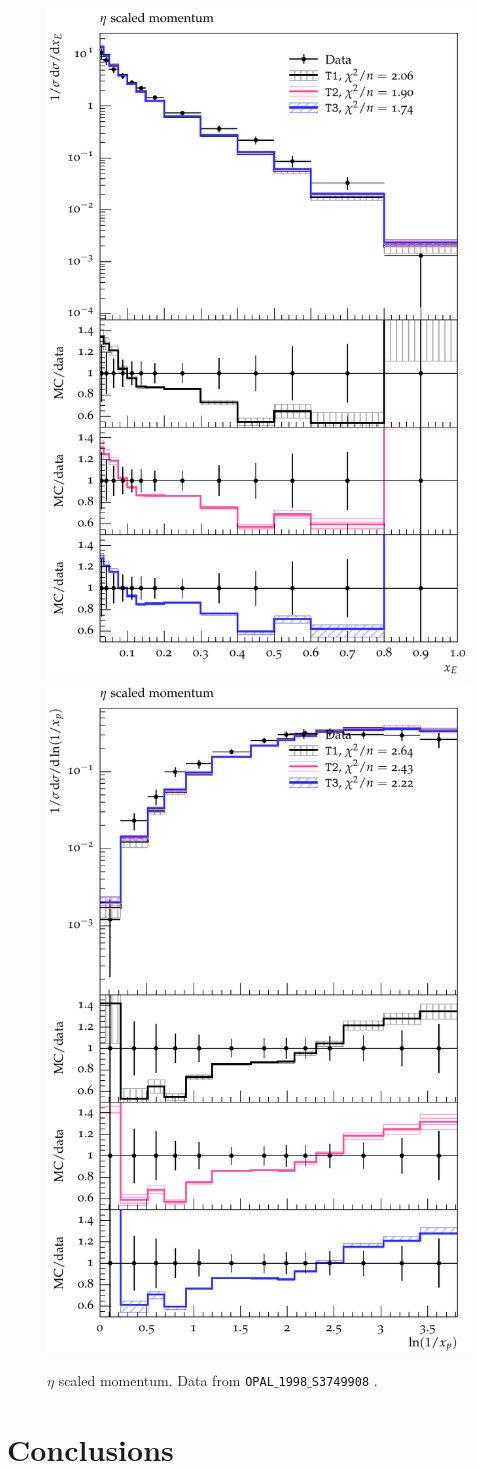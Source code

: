\documentclass[aps,preprint,floatfix,nofootinbib,showpacs]{revtex4-1}
\begin{document}
\begin{figure}[!t]
 \centering
 \includegraphics[width=0.47\linewidth]{New Figures/OPAL_1998_S3749908/d06-x01-y01.pdf}
 \hfill
 \includegraphics[width=0.47\linewidth]{New Figures/OPAL_1998_S3749908/d07-x01-y01.pdf}
  \caption{$\eta$ scaled momentum. Data from \texttt{OPAL$\_$1998$\_$S3749908} \cite{Ackerstaff:1998ap}.}
 \label{Fig.5}
\end{figure}

\clearpage
\section{Conclusions}

\appendix
\end{document}
